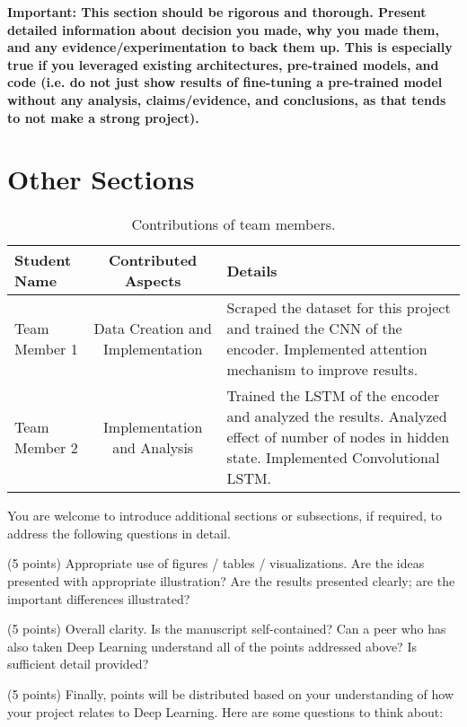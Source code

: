 \documentclass[10pt,twocolumn,letterpaper]{article}
\begin{document}
\textbf{Important: This section should be rigorous and thorough. Present detailed information about decision you made, why you made them, and any evidence/experimentation to back them up. This is especially true if you leveraged existing architectures, pre-trained models, and code (i.e. do not just show results of fine-tuning a pre-trained model without any analysis, claims/evidence, and conclusions, as that tends to not make a strong project). }

\section{Other Sections}

\begin{table*}
\begin{center}
\begin{tabular}{|l|c|p{8cm}|}
\hline
Student Name & Contributed Aspects & Details \\
\hline\hline
Team Member 1 & Data Creation and Implementation & Scraped the dataset for this project and trained the CNN of the encoder. Implemented attention mechanism to improve results. \\
Team Member 2 & Implementation and Analysis & Trained the LSTM of the encoder and analyzed the results. Analyzed effect of number of nodes in hidden state.  Implemented Convolutional LSTM. \\
\hline
\end{tabular}
\end{center}
\caption{Contributions of team members.}
\label{tab:contributions}
\end{table*}



You are welcome to introduce additional sections or subsections, if required, to address the following questions in detail. 

(5 points) Appropriate use of figures / tables / visualizations. Are the ideas presented with appropriate illustration? Are the results presented clearly; are the important differences illustrated? 

(5 points) Overall clarity. Is the manuscript self-contained? Can a peer who has also taken Deep Learning understand all of the points addressed above? Is sufficient detail provided? 

(5 points) Finally, points will be distributed based on your understanding of how your project relates to Deep Learning. Here are some questions to think about: 
\end{document}
